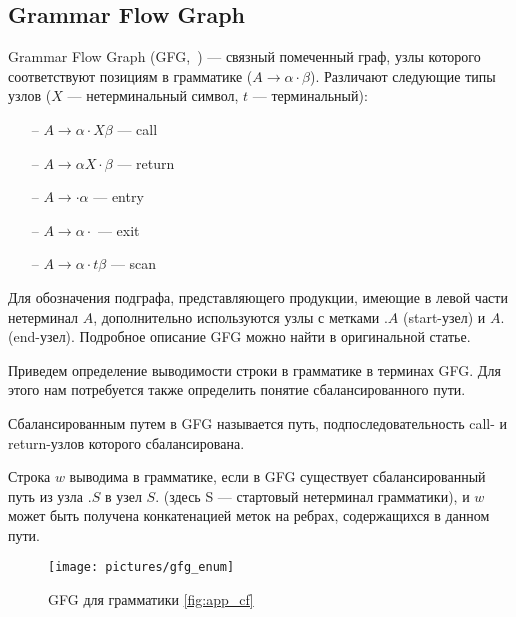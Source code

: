 \subsection{Grammar Flow Graph}

Grammar Flow Graph (GFG,~\cite{gfg}) --- связный помеченный граф, узлы которого соответствуют позициям в грамматике ($A \rightarrow \alpha \cdot \beta$). Различают следующие типы узлов ($X$ --- нетерминальный символ, $t$ --- терминальный):
\begin{itemize}
    \setlength\itemsep{-0.2em}
    \item[--] $A \rightarrow \alpha \cdot X \beta   $ --- call
    \item[--] $A \rightarrow \alpha X \cdot \beta$ --- return
    \item[--] $A \rightarrow \cdot \alpha$ --- entry
    \item[--] $A \rightarrow \alpha \cdot$ --- exit
    \item[--] $A \rightarrow \alpha \cdot t \beta$ --- scan
\end{itemize}
Для обозначения подграфа, представляющего продукции, имеющие в левой части нетерминал $A$, дополнительно используются узлы с метками $.A$ (start-узел) и $A.$ (end-узел). Подробное описание GFG можно найти в оригинальной статье.

Приведем определение выводимости строки в грамматике в терминах GFG. Для этого нам потребуется также определить понятие сбалансированного пути.

\begin{definition}
    Сбалансированным путем в GFG называется путь, подпоследовательность call- и return-узлов которого сбалансирована. 
\end{definition}

\begin{definition}
    Строка $w$ выводима в грамматике, если в GFG существует сбалансированный путь из узла $.S$ в узел $S.$ (здесь S --- стартовый нетерминал грамматики), и $w$ может быть получена конкатенацией меток на ребрах, содержащихся в данном пути. 
\end{definition}



\begin{figure}[h]
    \centering
    \texttt{[image: pictures/gfg\_enum]}
    \caption{GFG для грамматики \ref{fig:app_cf}}
    \label{fig:gfg}
\end{figure}
